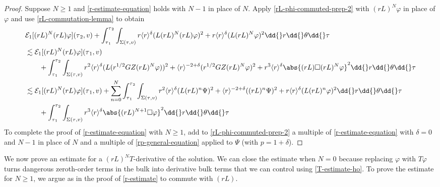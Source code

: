 \documentclass[10pt, reqno]{amsart}
\begin{document}
\begin{proof}
 Suppose \(N\ge 1\) and \cref{r-estimate-equation} holds
with \(N-1\) in place of \(N\). Apply \cref{rL-phi-commuted-prep-2} with
\((rL)^N\varphi{}\) in place of \(\varphi{}\) and use \cref{rL-commutation-lemma} to obtain
\begin{equation}
\begin{split}
&\mathcal{E}_1[(rL)^N(rL)\varphi{}](\tau{}_2,v) + \int_{\tau{}_1}^{\tau{}_2} \int _{\Sigma{}(\tau{},v)} r\langle{}r\rangle^\delta{}(L(rL)^N(rL)\varphi{})^2 + r\langle{}r\rangle^\delta{}(L(rL)^N\varphi{})^2\dd{}r\dd{}\theta{}\dd{}\tau{} \\
&\lesssim \mathcal{E}_1[(rL)^N(rL)\varphi{}](\tau{}_1,v) \\
&\qquad + \int_{\tau{}_1}^{\tau{}_2} \int _{\Sigma{}(\tau{},v)}r^2\langle{}r\rangle^\delta{}(L(r^{1/2}GZ(rL)^N\varphi{}))^2 + \langle{}r\rangle^{-2+\delta{}}(r^{1/2}GZ(rL)^N\varphi{})^2 + r^3\langle{}r\rangle^\delta{}\abs{(rL)\Box{}(rL)^N\varphi{}}^2\dd{}r\dd{}\theta{}\dd{}\tau{} \\
&\lesssim \mathcal{E}_1[(rL)^N(rL)\varphi{}](\tau{}_1,v) + \sum_{n=0}^N\int_{\tau{}_1}^{\tau{}_2} \int _{\Sigma{}(\tau{},v)}r^2\langle{}r\rangle^\delta{}(L(rL)^n\Psi{})^2  + \langle{}r\rangle^{-2+\delta{}}((rL)^n\Psi)^2 + r\langle{}r\rangle^\delta{}(L(rL)^n\varphi{})^2\dd{}r\dd{}\theta{}\dd{}\tau{} \\
&\qquad + \int_{\tau{}_1}^{\tau{}_2} \int _{\Sigma{}(\tau{},v)} r^3\langle{}r\rangle^\delta{}\abs{(rL)^{N+1}\Box{}\varphi{}}^2\dd{}r\dd{}\theta{}\dd{}\tau{}
\end{split}
\end{equation}
To complete the proof of \cref{r-estimate-equation} with \(N\ge 1\), add to
\cref{rL-phi-commuted-prep-2} a multiple of \cref{r-estimate-equation} with \(\delta{}
= 0\) and \(N-1\) in place of \(N\) and a multiple of \cref{rp-general-equation}
applied to \(\Psi{}\) (with \(p = 1+\delta{}\)).
\end{proof}
We now prove an estimate for a \((rL)^NT\)-derivative of the solution. We can
close the estimate when \(N = 0\) because replacing \(\varphi{}\) with
\(T\varphi{}\) turns dangerous zeroth-order terms in the bulk into derivative
bulk terms that we can control using \cref{T-estimate-ho}. To prove the estimate
for \(N \ge 1\), we argue as in the proof of \cref{r-estimate} to commute with
\((rL)\).
\end{document}
